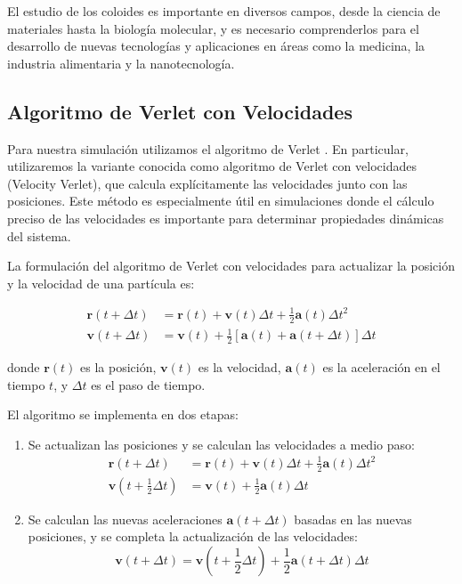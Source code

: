\documentclass[twocolumn]{article}
\begin{document}
El estudio de los coloides es importante en diversos campos, desde la ciencia de materiales hasta la biología molecular, y es necesario comprenderlos para el desarrollo de nuevas tecnologías y aplicaciones en áreas como la medicina, la industria alimentaria y la nanotecnología.

\subsection*{Algoritmo de Verlet con Velocidades}
Para nuestra simulación utilizamos el algoritmo de Verlet \cite{verlet_wiki}. En particular, utilizaremos la variante conocida como algoritmo de Verlet con velocidades (Velocity Verlet), que calcula explícitamente las velocidades junto con las posiciones. Este método es especialmente útil en simulaciones donde el cálculo preciso de las velocidades es importante para determinar propiedades dinámicas del sistema.

La formulación del algoritmo de Verlet con velocidades para actualizar la posición y la velocidad de una partícula es:

\begin{align}
    \mathbf{r}(t + \Delta t) &= \mathbf{r}(t) + \mathbf{v}(t)\Delta t + \frac{1}{2}\mathbf{a}(t)\Delta t^2 \\
    \mathbf{v}(t + \Delta t) &= \mathbf{v}(t) + \frac{1}{2}[\mathbf{a}(t) + \mathbf{a}(t + \Delta t)]\Delta t
\end{align}

donde $\mathbf{r}(t)$ es la posición, $\mathbf{v}(t)$ es la velocidad, $\mathbf{a}(t)$ es la aceleración en el tiempo $t$, y $\Delta t$ es el paso de tiempo.

El algoritmo se implementa en dos etapas:
\begin{enumerate}
    \item Se actualizan las posiciones y se calculan las velocidades a medio paso:
    \begin{align}
        \mathbf{r}(t + \Delta t) &= \mathbf{r}(t) + \mathbf{v}(t)\Delta t + \frac{1}{2}\mathbf{a}(t)\Delta t^2 \\
        \mathbf{v}(t + \frac{1}{2}\Delta t) &= \mathbf{v}(t) + \frac{1}{2}\mathbf{a}(t)\Delta t
    \end{align}
    \item Se calculan las nuevas aceleraciones $\mathbf{a}(t + \Delta t)$ basadas en las nuevas posiciones, y se completa la actualización de las velocidades:
    \begin{equation}
        \mathbf{v}(t + \Delta t) = \mathbf{v}(t + \frac{1}{2}\Delta t) + \frac{1}{2}\mathbf{a}(t + \Delta t)\Delta t
    \end{equation}
\end{enumerate}
\end{document}
